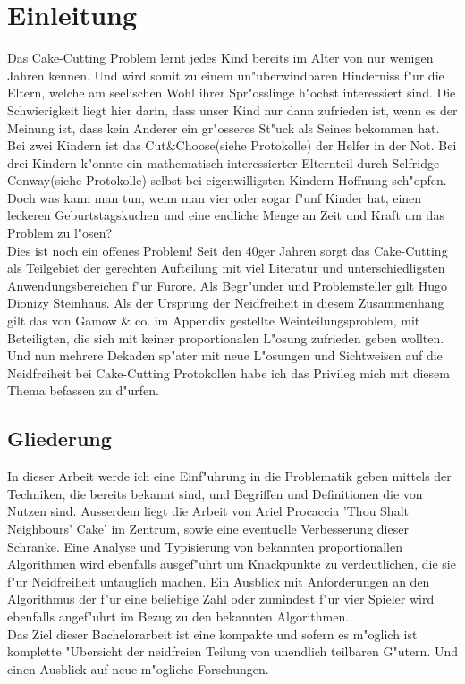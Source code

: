 \documentclass[11pt, a4paper, twoside]{article}
\numberwithin{equation}{section}
\begin{document}
\section{Einleitung}
Das Cake-Cutting Problem lernt jedes Kind bereits im Alter von nur wenigen Jahren kennen. Und wird somit zu einem un"uberwindbaren Hinderniss f"ur die Eltern, welche am seelischen Wohl ihrer Spr"osslinge h"ochst interessiert sind. Die Schwierigkeit liegt hier darin, dass unser Kind nur dann zufrieden ist, wenn es der Meinung ist, dass kein Anderer ein gr"osseres St"uck als Seines bekommen hat. Bei zwei Kindern ist das Cut$\&$Choose(siehe Protokolle) der Helfer in der Not. Bei drei Kindern k"onnte ein mathematisch interessierter Elternteil durch Selfridge-Conway(siehe Protokolle) selbst bei eigenwilligsten Kindern Hoffnung sch"opfen. Doch was kann man tun, wenn man vier oder sogar f"unf Kinder hat, einen leckeren Geburtstagskuchen und eine endliche Menge an Zeit und Kraft um das Problem zu l"osen?\\
Dies ist noch ein offenes Problem! Seit den 40ger Jahren sorgt das Cake-Cutting als Teilgebiet der gerechten Aufteilung mit viel Literatur und unterschiedligsten Anwendungsbereichen f"ur Furore. Als Begr"under und Problemsteller gilt Hugo Dionizy Steinhaus. Als der Ursprung der Neidfreiheit in diesem Zusammenhang gilt das von Gamow $\&$ co. im Appendix gestellte Weinteilungsproblem, mit Beteiligten, die sich mit keiner proportionalen L"osung zufrieden geben wollten. Und nun mehrere Dekaden sp"ater mit neue L"osungen und Sichtweisen auf die Neidfreiheit bei Cake-Cutting Protokollen habe ich das Privileg mich mit diesem Thema befassen zu d"urfen.\\ 
\subsection{Gliederung}
In dieser Arbeit werde ich eine Einf"uhrung in die Problematik geben mittels der Techniken, die bereits bekannt sind, und Begriffen und Definitionen die von Nutzen sind. Ausserdem liegt die Arbeit von Ariel Procaccia 'Thou Shalt Neighbours' Cake' im Zentrum, sowie eine eventuelle Verbesserung dieser Schranke. Eine Analyse und Typisierung von bekannten proportionallen Algorithmen wird ebenfalls ausgef"uhrt um Knackpunkte zu verdeutlichen, die sie f"ur Neidfreiheit untauglich machen. Ein Ausblick mit Anforderungen an den Algorithmus der f"ur eine beliebige Zahl oder zumindest f"ur vier Spieler wird ebenfalls angef"uhrt im Bezug zu den bekannten Algorithmen.\\
Das Ziel dieser Bachelorarbeit ist eine kompakte und sofern es m"oglich ist komplette "Ubersicht der neidfreien Teilung von unendlich teilbaren G"utern. Und einen Ausblick auf neue m"ogliche Forschungen.\\
\newpage
\end{document}
